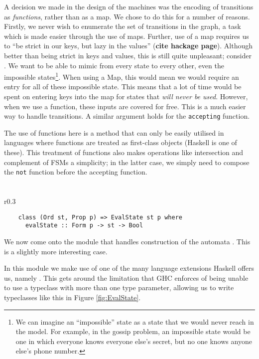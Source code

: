 \documentclass[10pt, a4paper]{report}
\begin{document}
A decision we made in the design of the machines was the encoding of transitions
as \emph{functions}, rather than as a map. We chose to do this for a number of
reasons. Firstly, we never wish to enumerate the set of transitions in the
graph, a task which is made easier through the use of maps. Further, use of a
map requires us to ``be strict in our keys, but lazy in the values''
(\textbf{cite hackage page}). Although better than being strict in keys and
values, this is still quite unpleasant; consider \mestar. We want to be able to
mimic from every state to every other, even the impossible states\footnote{We
  can imagine an ``impossible'' state as a state that we would never reach in
  the model. For example, in the gossip problem, an impossible state would be
  one in which everyone knows everyone else's secret, but no one knows anyone
  else's phone number.}. When using a Map, this would mean we would require an
entry for all of these impossible state. This means that a lot of time would be
spent on entering keys into the map for states that \emph{will never be used}.
However, when we use a function, these inputs are covered for free. This is a
much easier way to handle transitions. A similar argument holds for the
\texttt{accepting} function. 

The use of functions here is a method that can only be easily utilised in
languages where functions are treated as first-class objects (Haskell is one of
these). This treatment of functions also makes operations like intersection and
complement of FSMs a simplicity; in the latter case, we simply need to compose
the \texttt{not} function before the accepting function. 

\section{}
\label{sec:MEHaskell}

\begin{wrapfigure}{r}{0.3\textwidth}
  \begin{verbatim}
    class (Ord st, Prop p) => EvalState st p where
      evalState :: Form p -> st -> Bool
\end{verbatim}
  \caption{}
  \label{fig:EvalState}
\end{wrapfigure}

We now come onto the module that handles construction of the automata \mestar.
This is a slightly more interesting case.

In this module we make use of one of the many language extensions Haskell offers
us, namely . This gets around the limitation that
GHC enforces of being unable to use a typeclass with more than one type
parameter, allowing us to write typeclasses like this in Figure
\ref{fig:EvalState}.
\end{document}
